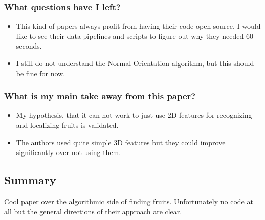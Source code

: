     \subsubsection*{What questions have I left?}
    \begin{itemize}
        \item This kind of papers always profit from having their code open source. I would like to see their data pipelines and scripts to figure out why they needed 60 seconds.
        \item I still do not understand the Normal Orientation algorithm, but this should be fine for now.
    \end{itemize}
    \subsubsection*{What is my main take away from this paper?}
    \begin{itemize}
        \item My hypothesis, that it can not work to just use 2D features for recognizing and localizing fruits is validated.\
        \item The  authors used quite simple 3D features but they could improve significantly over not using them. 
    \end{itemize}
    
    \subsection*{Summary}
    Cool paper over the algorithmic side of finding fruits.  Unfortunately no code at all but the general directions of their approach are clear.


